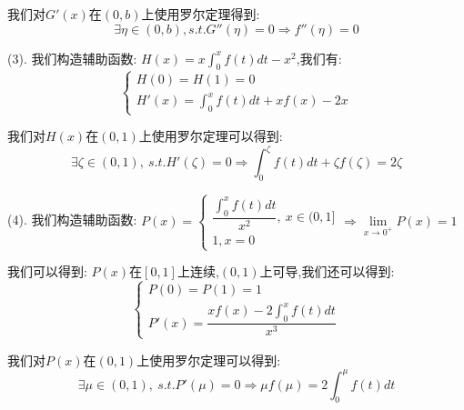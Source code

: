 \begin{solution}
	我们对$G'(x)$在$(0,b)$上使用罗尔定理得到:  
	$$\exists \eta\in(0,b),s.t. G''(\eta)=0\Rightarrow f''(\eta)=0$$
	
	(3). 我们构造辅助函数:  $H(x)=x\int_{0}^{x}f(t)dt-x^2$,我们有:  
	$$\left\lbrace
	\begin{array}{l}
		H(0)=H(1)=0\\
		H'(x)=\int_{0}^{x}f(t)dt+xf(x)-2x
	\end{array}
	\right. $$
	
	我们对$H(x)$在$(0,1)$上使用罗尔定理可以得到:  
	$$\exists \zeta\in(0,1),\ s.t. H'(\zeta)=0\Rightarrow \int_{0}^{\zeta}f(t)dt+\zeta f(\zeta)=2\zeta$$
	
	(4). 我们构造辅助函数:  $P(x)=\left\lbrace
	\begin{array}{l}
		\dfrac{\int_{0}^{x}f(t)dt}{x^2},\ x\in(0,1]\\
		1,x=0
	\end{array}
	\right. \Rightarrow \lim\limits_{x\to 0^{+}}P(x)=1$
	
	我们可以得到:  $P(x)$在$[0,1]$上连续,$(0,1)$上可导,我们还可以得到:  
	$$\left\lbrace
	\begin{array}{l}
		P(0)=P(1)=1\\
		P'(x)=\dfrac{xf(x)-2\int_{0}^{x}f(t)dt}{x^3}
	\end{array}
	\right. $$
	
	我们对$P(x)$在$(0,1)$上使用罗尔定理可以得到:  
	$$\exists \mu\in(0,1),\ s.t. P'(\mu)=0\Rightarrow \mu f(\mu)=2\int_{0}^{\mu}f(t)dt$$
\end{solution}
